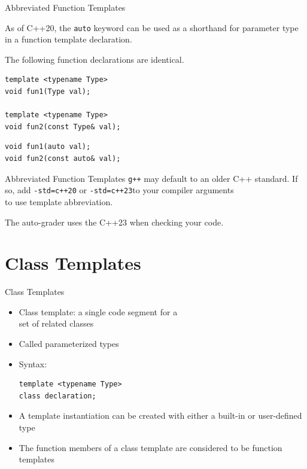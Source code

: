 \documentclass[14pt,aspectratio=1610, hyperref={pdfpagelayout=SinglePage}]{beamer}
\begin{document}
\begin{frame}[fragile]{Abbreviated Function Templates}

As of C++20, the \lstinline{auto} keyword can be used as a shorthand for parameter type in a function template declaration.

The following function declarations are identical.

\begin{lstlisting}
template <typename Type>
void fun1(Type val);

template <typename Type>
void fun2(const Type& val);
\end{lstlisting}

\begin{lstlisting}
void fun1(auto val);
void fun2(const auto& val);
\end{lstlisting}
\end{frame}

\begin{frame}{Abbreviated Function Templates}
\texttt{g++} may default to an older C++ standard. If so, add \lstinline[language=Bash, identifierstyle=\color{white}]{-std=c++20} or \lstinline[language=Bash, identifierstyle=\color{white}]{-std=c++23}to your compiler arguments\\ to use template abbreviation.

The auto-grader uses the C++23 when checking your code.
\end{frame}

\section{Class Templates}

\begin{frame}[fragile]{Class Templates}
\protect\hypertarget{class-templates}{}
\begin{itemize}
\item
  Class template: a single code segment for a\\ set of related classes
\item
  Called parameterized types
\item
  Syntax:
\begin{lstlisting}
template <typename Type>
class declaration;
\end{lstlisting}
\item
  A template instantiation can be created with either a built-in or
  user-defined type
\item
  The function members of a class template are considered to be function
  templates
\end{itemize}
\end{frame}
\end{document}

